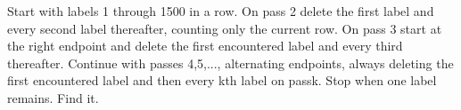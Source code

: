 Start with labels 1 through 1500 in a row. On pass 2 delete the first label and every second label thereafter, counting only the current row. On pass 3 start at the right endpoint and delete the first encountered label and every third thereafter. Continue with passes 4,5,..., alternating endpoints, always deleting the first encountered label and then every kth label on passk. Stop when one label remains. Find it.
